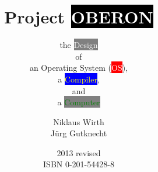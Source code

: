 \documentclass[a5paper,footinclude=true,headinclude=true]{scrbook}
\begin{document}
\title{Project \colorbox{black}{\textcolor{white}{OBERON}}}
\subtitle{ the \colorbox{gray}{\textcolor{white}{Design}}\\of\\an Operating System
              (\colorbox{red}{\textcolor{white}{OS}}),\\a
               \colorbox{blue}{\textcolor{yellow}{Compiler}},\\and\\a
               \colorbox{gray}{\textcolor{green}{Computer}}}
\author{Niklaus Wirth\\Jürg Gutknecht}
\date{2013 revised\\ISBN 0-201-54428-8}
\maketitle
%
%
%
%







%
%
%
%
%
%
%
%
%
%
%
%
%
%
%
\end{document}
